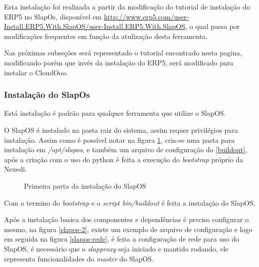 Esta instalação foi realizada a partir da modificação do tutorial de instalação do ERP5 no SlapOs, disponível em \url{http://www.erp5.com/user-Install.ERP5.With.SlapOS/user-Install.ERP5.With.SlapOS}, o qual passa por modificações frequentes em função da atulização desta ferramenta.

Nas próximas subseções será representado o tutorial encontrado nesta pagina, modificando porém que invés da instalação do ERP5, será modificado para instalar o CloudOoo.

\subsubsection{Instalação do SlapOs}

Está instalação é padrão para qualquer ferramenta que utilize o SlapOS.

O SlapOS é instalado na pasta raiz do sistema, assim requer privilégios para instalação. Assim como é possível notar na figura \ref{slapos-1}, cria-se uma pasta para instalação em \textit{/opt/slapos}, e também um arquivo de configuração do \ref{buildout}, após a criação com o uso do python é feita a execução do \textit{bootstrap} próprio da Nexedi.

\begin{figure}[ht]
    \centering
    \caption{Primeira parta da instalação do SlapOS}
    \label{slapos-1}
\end{figure}

Com o termino do \textit{bootstrap} e o \textit{ script bin/buildout} é feita a instalação do SlapOS.

Após a instalação basica dos componentes e dependências é preciso configurar o mesmo, na figura \ref{slapos-2}, existe um exemplo de arquivo de configuração e logo em seguida na figura \ref{slapos-rede}, é feita a configuração de rede para uso do SlapOS, é necessário que o \textit{slapproxy} seja iniciado e mantido rodando, ele representa funcionalidades do \textit{master} do SlapOS.

